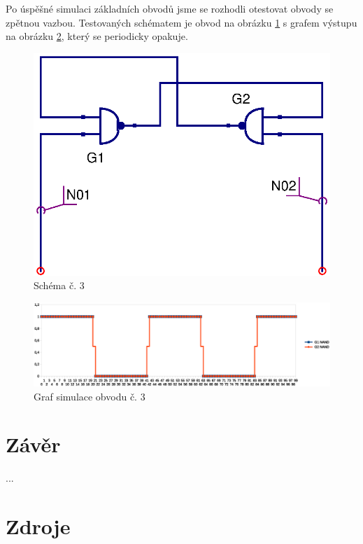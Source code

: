 \documentclass[11pt,a4paper]{article}
\begin{document}
			Po úspěšné simulaci základních obvodů jsme se rozhodli otestovat obvody se zpětnou vazbou. Testovaných schématem je obvod na obrázku \ref{fig:scheme3} s grafem výstupu na obrázku \ref{fig:graf3}, který se periodicky opakuje.

			\begin{figure}[!htb]
				\centering
					\includegraphics[scale=.5]{input3.eps}
					\caption{Schéma č. 3}
					\label{fig:scheme3}
			\end{figure}

			\begin{figure}[!htb]
				\centering
					\includegraphics[scale=.6]{graf3.eps}
					\caption{Graf simulace obvodu č. 3}
					\label{fig:graf3}
			\end{figure}





	\section{Závěr}
		...


	\section{Zdroje}

	
\end{document}
